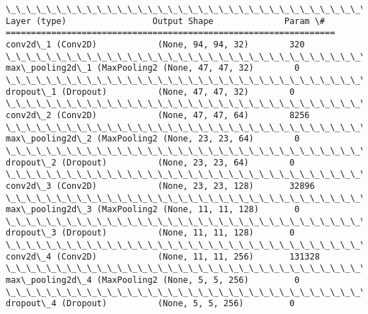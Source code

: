 \documentclass[11pt]{article}
\begin{document}
    \begin{Verbatim}[commandchars=\\\{\}]
\_\_\_\_\_\_\_\_\_\_\_\_\_\_\_\_\_\_\_\_\_\_\_\_\_\_\_\_\_\_\_\_\_\_\_\_\_\_\_\_\_\_\_\_\_\_\_\_\_\_\_\_\_\_\_\_\_\_\_\_\_\_\_\_\_
Layer (type)                 Output Shape              Param \#   
=================================================================
conv2d\_1 (Conv2D)            (None, 94, 94, 32)        320       
\_\_\_\_\_\_\_\_\_\_\_\_\_\_\_\_\_\_\_\_\_\_\_\_\_\_\_\_\_\_\_\_\_\_\_\_\_\_\_\_\_\_\_\_\_\_\_\_\_\_\_\_\_\_\_\_\_\_\_\_\_\_\_\_\_
max\_pooling2d\_1 (MaxPooling2 (None, 47, 47, 32)        0         
\_\_\_\_\_\_\_\_\_\_\_\_\_\_\_\_\_\_\_\_\_\_\_\_\_\_\_\_\_\_\_\_\_\_\_\_\_\_\_\_\_\_\_\_\_\_\_\_\_\_\_\_\_\_\_\_\_\_\_\_\_\_\_\_\_
dropout\_1 (Dropout)          (None, 47, 47, 32)        0         
\_\_\_\_\_\_\_\_\_\_\_\_\_\_\_\_\_\_\_\_\_\_\_\_\_\_\_\_\_\_\_\_\_\_\_\_\_\_\_\_\_\_\_\_\_\_\_\_\_\_\_\_\_\_\_\_\_\_\_\_\_\_\_\_\_
conv2d\_2 (Conv2D)            (None, 47, 47, 64)        8256      
\_\_\_\_\_\_\_\_\_\_\_\_\_\_\_\_\_\_\_\_\_\_\_\_\_\_\_\_\_\_\_\_\_\_\_\_\_\_\_\_\_\_\_\_\_\_\_\_\_\_\_\_\_\_\_\_\_\_\_\_\_\_\_\_\_
max\_pooling2d\_2 (MaxPooling2 (None, 23, 23, 64)        0         
\_\_\_\_\_\_\_\_\_\_\_\_\_\_\_\_\_\_\_\_\_\_\_\_\_\_\_\_\_\_\_\_\_\_\_\_\_\_\_\_\_\_\_\_\_\_\_\_\_\_\_\_\_\_\_\_\_\_\_\_\_\_\_\_\_
dropout\_2 (Dropout)          (None, 23, 23, 64)        0         
\_\_\_\_\_\_\_\_\_\_\_\_\_\_\_\_\_\_\_\_\_\_\_\_\_\_\_\_\_\_\_\_\_\_\_\_\_\_\_\_\_\_\_\_\_\_\_\_\_\_\_\_\_\_\_\_\_\_\_\_\_\_\_\_\_
conv2d\_3 (Conv2D)            (None, 23, 23, 128)       32896     
\_\_\_\_\_\_\_\_\_\_\_\_\_\_\_\_\_\_\_\_\_\_\_\_\_\_\_\_\_\_\_\_\_\_\_\_\_\_\_\_\_\_\_\_\_\_\_\_\_\_\_\_\_\_\_\_\_\_\_\_\_\_\_\_\_
max\_pooling2d\_3 (MaxPooling2 (None, 11, 11, 128)       0         
\_\_\_\_\_\_\_\_\_\_\_\_\_\_\_\_\_\_\_\_\_\_\_\_\_\_\_\_\_\_\_\_\_\_\_\_\_\_\_\_\_\_\_\_\_\_\_\_\_\_\_\_\_\_\_\_\_\_\_\_\_\_\_\_\_
dropout\_3 (Dropout)          (None, 11, 11, 128)       0         
\_\_\_\_\_\_\_\_\_\_\_\_\_\_\_\_\_\_\_\_\_\_\_\_\_\_\_\_\_\_\_\_\_\_\_\_\_\_\_\_\_\_\_\_\_\_\_\_\_\_\_\_\_\_\_\_\_\_\_\_\_\_\_\_\_
conv2d\_4 (Conv2D)            (None, 11, 11, 256)       131328    
\_\_\_\_\_\_\_\_\_\_\_\_\_\_\_\_\_\_\_\_\_\_\_\_\_\_\_\_\_\_\_\_\_\_\_\_\_\_\_\_\_\_\_\_\_\_\_\_\_\_\_\_\_\_\_\_\_\_\_\_\_\_\_\_\_
max\_pooling2d\_4 (MaxPooling2 (None, 5, 5, 256)         0         
\_\_\_\_\_\_\_\_\_\_\_\_\_\_\_\_\_\_\_\_\_\_\_\_\_\_\_\_\_\_\_\_\_\_\_\_\_\_\_\_\_\_\_\_\_\_\_\_\_\_\_\_\_\_\_\_\_\_\_\_\_\_\_\_\_
dropout\_4 (Dropout)          (None, 5, 5, 256)         0         

\end{Verbatim}
\end{document}
